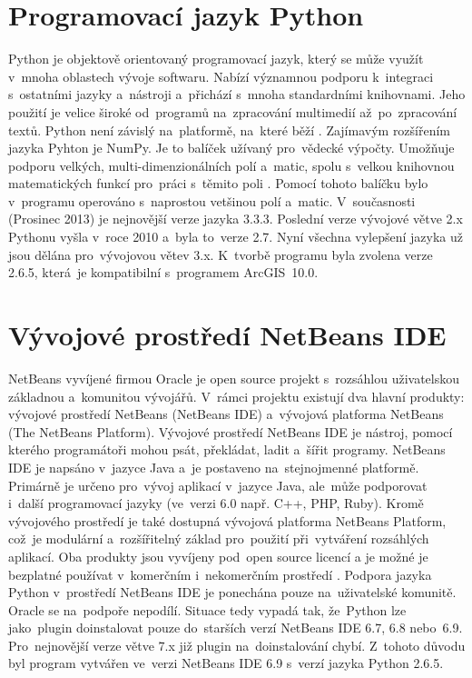 \section{Programovací jazyk Python} \label{section:python}
Python je objektově orientovaný programovací jazyk, který se může využít v~mnoha oblastech vývoje softwaru. Nabízí významnou podporu k~integraci s~ostatními jazyky a~nástroji a~přichází s~mnoha standardními knihovnami.
Jeho použití je velice široké od~programů na~zpracování multimedií až~po~zpracování textů. Python není závislý na~platformě, na~které běží \cite{python}. Zajímavým rozšířením jazyka Pyhton je NumPy. 
Je to balíček užívaný pro~vědecké výpočty. Umožňuje podporu velkých, multi-dimenzionálních polí a~matic, spolu s~velkou knihovnou matematických funkcí pro~práci s~těmito poli \cite{numpy}. 
Pomocí tohoto balíčku bylo v~programu operováno s~naprostou vetšinou polí a~matic. 
V~současnosti (Prosinec 2013) je nejnovější verze jazyka 3.3.3. Poslední verze vývojové větve 2.x Pythonu vyšla v~roce 2010 a~byla to~verze 2.7. 
Nyní všechna vylepšení jazyka už jsou dělána pro~vývojovou větev 3.x. K~tvorbě programu byla zvolena verze 2.6.5, která~je kompatibilní s~programem ArcGIS~10.0.     
\section{Vývojové prostředí NetBeans IDE} \label{section:netbeans}
NetBeans vyvíjené firmou Oracle je open source projekt s~rozsáhlou uživatelskou základnou a~komunitou vývojářů. V~rámci projektu existují dva hlavní produkty: vývojové prostředí NetBeans (NetBeans IDE) a~vývojová platforma NetBeans (The NetBeans Platform).
Vývojové prostředí NetBeans IDE je nástroj, pomocí kterého programátoři mohou psát, překládat, ladit a~šířit programy. NetBeans IDE je napsáno v~jazyce Java a~je postaveno na~stejnojmenné platformě. 
Primárně je určeno pro~vývoj aplikací v~jazyce Java, ale~může podporovat i~další programovací jazyky (ve~verzi 6.0 např. C++, PHP, Ruby). Kromě vývojového prostředí je také dostupná vývojová platforma NetBeans Platform, 
což~je modulární a~rozšířitelný základ pro~použití při~vytváření rozsáhlých aplikací. Oba produkty jsou vyvíjeny pod~open source licencí a je možné je bezplatné používat v~komerčním i~nekomerčním prostředí \cite{netbeans}.
Podpora jazyka Python v~prostředí NetBeans IDE je ponechána pouze na~uživatelské komunitě. Oracle se na~podpoře nepodílí. Situace tedy vypadá tak, že~Python lze jako~plugin doinstalovat pouze do~starších verzí NetBeans IDE 6.7, 6.8 nebo~6.9.
Pro~nejnovější verze větve 7.x již plugin na~doinstalování chybí. Z~tohoto důvodu byl program vytvářen ve~verzi NetBeans IDE 6.9 s~verzí jazyka Python 2.6.5. 
